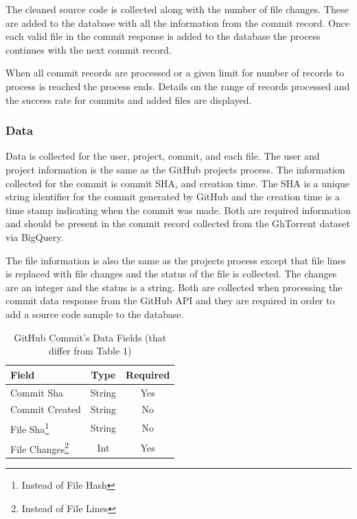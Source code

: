 \documentclass[12pt]{article}
\begin{document}
The cleaned source code is collected along with the number of file changes. These are added to the database with all the information from the commit record.
Once each valid file in the commit response is added to the database the process continues with the next commit record.

When all commit records are processed or a given limit for number of records to process is reached the process ends. Details on the range of records processed and the success rate for commits and added files are displayed.

\subsubsection*{Data}
Data is collected for the user, project, commit, and each file. The user and project information is the same as the GitHub projects process. The information collected for the commit is commit SHA, and creation time. The SHA is a unique string identifier for the commit generated by GitHub and the creation time is a time stamp indicating when the commit was made. Both are required information and should be present in the commit record collected from the GhTorrent dataset via BigQuery.

The file information is also the same as the projects process except that file lines is replaced with file changes and the status of the file is collected. The changes are an integer and the status is a string. Both are collected when processing the commit data response from the GitHub API and they are required in order to add a source code sample to the database.

\begin{table}[t]
    \begin{center}
        \caption{GitHub Commit's Data Fields (that differ from Table 1)}
        \label{tab:commit_data}
        \begin{tabular}{|l | c | c |}
            \hline
            \textbf{Field} & \textbf{Type} & \textbf{Required}\\
            \hline
            Commit Sha & String & Yes\\
            Commit Created & String & No\\
            File Sha\footnote{Instead of File Hash} & String & No\\
            File Changes\footnote{Instead of File Lines} & Int & Yes\\
            \hline
        \end{tabular}
    \end{center}
\end{table}
\end{document}
